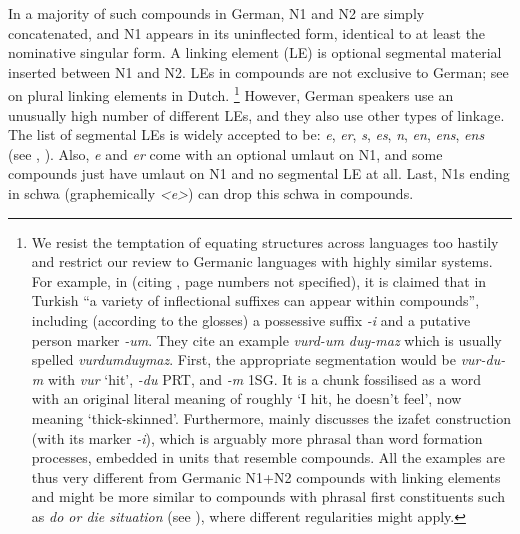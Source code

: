In a majority of such compounds in German, N1 and N2 are simply concatenated, and N1 appears in its uninflected form, identical to at least the nominative singular form.
A linking element (LE) is optional segmental material inserted between N1 and N2.
LEs in compounds are not exclusive to German; see \textcite{SchreuderEa1998,BangaEa2013a,BangaEa2013b} on plural linking elements in Dutch.%
\footnote{We resist the temptation of equating structures across languages too hastily and restrict our review to Germanic languages with highly similar systems.
For example, in \textcite[4]{KirchnerNicoladis2009} (citing \citealt{Spencer1991}, page numbers not specified), it is claimed that in Turkish ``a variety of inflectional suffixes can appear within compounds'', including (according to the glosses) a possessive suffix \textit{-i} and a putative person marker \mbox{\textit{-um}}.
They cite an example \textit{vurd-um duy-maz} which is usually spelled \textit{vurdumduymaz}.
First, the appropriate segmentation would be \textit{vur-du-m} with \textit{vur} `hit', \textit{-du} PRT, and \textit{-m} \textsc{1SG}.
It is a chunk fossilised as a word with an original literal meaning of roughly `I hit, he doesn't feel', now meaning `thick-skinned'.
Furthermore, \textcite[313--319]{Spencer1991} mainly discusses the izafet construction (with its marker \textit{-i}), which is arguably more phrasal than word formation processes, embedded in units that resemble compounds.
All the examples are thus very different from Germanic N1+N2 compounds with linking elements and might be more similar to compounds with phrasal first constituents such as \textit{do or die situation} (see \citealt[366]{Olsen2015}), where different regularities might apply.
}
However, German speakers use an unusually high number of different LEs, and they also use other types of linkage.
The list of segmental LEs is widely accepted to be: \textit{e}, \textit{er}, \textit{s}, \textit{es}, \textit{n}, \textit{en}, \textit{ens}, \textit{ens} (see \citealt[31]{Neef2015}, \citealt{KrottEa2007}).
Also, \textit{e} and \textit{er} come with an optional umlaut on N1, and some compounds just have umlaut on N1 and no segmental LE at all.
Last, N1s ending in schwa (graphemically \textit{<e>}) can drop this schwa in compounds.

